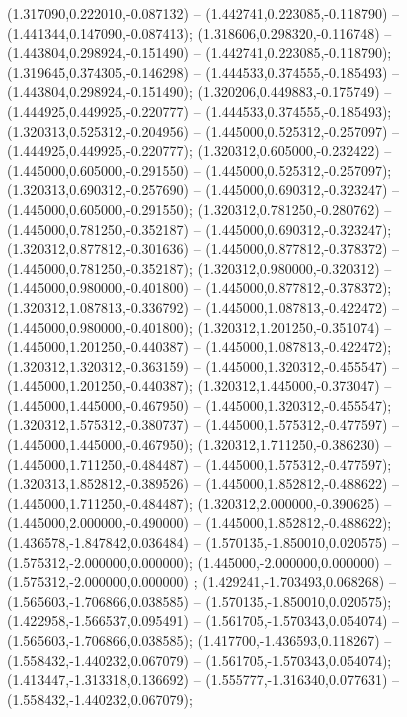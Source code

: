  (1.317090,0.222010,-0.087132) -- (1.442741,0.223085,-0.118790) -- (1.441344,0.147090,-0.087413);
 (1.318606,0.298320,-0.116748) -- (1.443804,0.298924,-0.151490) -- (1.442741,0.223085,-0.118790);
 (1.319645,0.374305,-0.146298) -- (1.444533,0.374555,-0.185493) -- (1.443804,0.298924,-0.151490);
 (1.320206,0.449883,-0.175749) -- (1.444925,0.449925,-0.220777) -- (1.444533,0.374555,-0.185493);
 (1.320313,0.525312,-0.204956) -- (1.445000,0.525312,-0.257097) -- (1.444925,0.449925,-0.220777);
 (1.320312,0.605000,-0.232422) -- (1.445000,0.605000,-0.291550) -- (1.445000,0.525312,-0.257097);
 (1.320313,0.690312,-0.257690) -- (1.445000,0.690312,-0.323247) -- (1.445000,0.605000,-0.291550);
 (1.320312,0.781250,-0.280762) -- (1.445000,0.781250,-0.352187) -- (1.445000,0.690312,-0.323247);
 (1.320312,0.877812,-0.301636) -- (1.445000,0.877812,-0.378372) -- (1.445000,0.781250,-0.352187);
 (1.320312,0.980000,-0.320312) -- (1.445000,0.980000,-0.401800) -- (1.445000,0.877812,-0.378372);
 (1.320312,1.087813,-0.336792) -- (1.445000,1.087813,-0.422472) -- (1.445000,0.980000,-0.401800);
 (1.320312,1.201250,-0.351074) -- (1.445000,1.201250,-0.440387) -- (1.445000,1.087813,-0.422472);
 (1.320312,1.320312,-0.363159) -- (1.445000,1.320312,-0.455547) -- (1.445000,1.201250,-0.440387);
 (1.320312,1.445000,-0.373047) -- (1.445000,1.445000,-0.467950) -- (1.445000,1.320312,-0.455547);
 (1.320312,1.575312,-0.380737) -- (1.445000,1.575312,-0.477597) -- (1.445000,1.445000,-0.467950);
 (1.320312,1.711250,-0.386230) -- (1.445000,1.711250,-0.484487) -- (1.445000,1.575312,-0.477597);
 (1.320313,1.852812,-0.389526) -- (1.445000,1.852812,-0.488622) -- (1.445000,1.711250,-0.484487);
 (1.320312,2.000000,-0.390625) -- (1.445000,2.000000,-0.490000) -- (1.445000,1.852812,-0.488622);
 (1.436578,-1.847842,0.036484) -- (1.570135,-1.850010,0.020575) -- (1.575312,-2.000000,0.000000);
 (1.445000,-2.000000,0.000000) -- (1.575312,-2.000000,0.000000) ;
 (1.429241,-1.703493,0.068268) -- (1.565603,-1.706866,0.038585) -- (1.570135,-1.850010,0.020575);
 (1.422958,-1.566537,0.095491) -- (1.561705,-1.570343,0.054074) -- (1.565603,-1.706866,0.038585);
 (1.417700,-1.436593,0.118267) -- (1.558432,-1.440232,0.067079) -- (1.561705,-1.570343,0.054074);
 (1.413447,-1.313318,0.136692) -- (1.555777,-1.316340,0.077631) -- (1.558432,-1.440232,0.067079);
